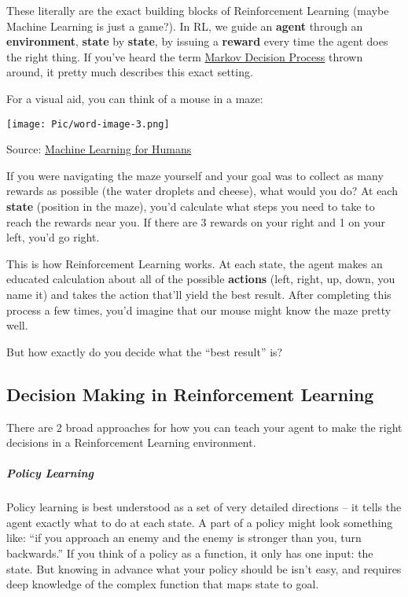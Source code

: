 \documentclass[a4paper, 11pt]{article}
\begin{document}
These literally are the exact building blocks of Reinforcement Learning
(maybe Machine Learning is just a game?). In RL, we guide an
\textbf{agent} through an \textbf{environment}, \textbf{state} by
\textbf{state}, by issuing a \textbf{reward} every time the agent does
the right thing. If you've heard the term
\href{https://en.wikipedia.org/wiki/Markov_decision_process}{Markov
Decision Process} thrown around, it pretty much describes this exact
setting.

For a visual aid, you can think of a mouse in a maze:

\texttt{[image: Pic/word-image-3.png]}

Source:
\href{https://medium.com/machine-learning-for-humans/reinforcement-learning-6eacf258b265}{Machine
Learning for Humans}

If you were navigating the maze yourself and your goal was to collect as
many rewards as possible (the water droplets and cheese), what would you
do? At each \textbf{state} (position in the maze), you'd calculate what
steps you need to take to reach the rewards near you. If there are 3
rewards on your right and 1 on your left, you'd go right.

This is how Reinforcement Learning works. At each state, the agent makes
an educated calculation about all of the possible \textbf{actions}
(left, right, up, down, you name it) and takes the action that'll yield
the best result. After completing this process a few times, you'd
imagine that our mouse might know the maze pretty well.

But how exactly do you decide what the ``best result'' is?

\subsection{\textbf{Decision Making in Reinforcement Learning}}

There are 2 broad approaches for how you can teach your agent to make
the right decisions in a Reinforcement Learning environment.

\subparagraph{\emph{Policy Learning}}

Policy learning is best understood as a set of very detailed directions
-- it tells the agent exactly what to do at each state. A part of a
policy might look something like: ``if you approach an enemy and the
enemy is stronger than you, turn backwards.'' If you think of a policy
as a function, it only has one input: the state. But knowing in advance
what your policy should be isn't easy, and requires deep knowledge of
the complex function that maps state to goal.
\end{document}
